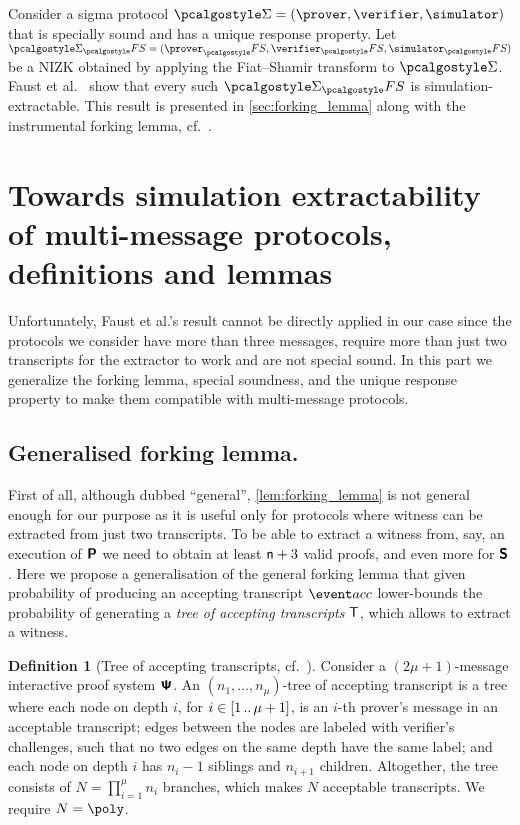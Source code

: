 \documentclass[runningheads,11pt]{llncs}
\theoremstyle{definition} \newtheorem{definition}[theorem]{Definition}
\begin{document}
Consider a sigma protocol $\sigmaprot = (\prover, \verifier, \simulator)$ that
is specially sound and has a unique response property. Let $\sigmaprot_\fs =
(\prover_\fs, \verifier_\fs, \simulator_\fs)$ be a NIZK obtained by applying the
Fiat--Shamir transform to $\sigmaprot$. Faust et al.~\cite{INDOCRYPT:FKMV12}
show that every such $\sigmaprot_\fs$ is simulation-extractable. This result is
presented in \cref{sec:forking_lemma} along with the instrumental forking lemma,
cf.~\cite{CCS:BelNev06}.

\section{Towards simulation extractability of multi-message protocols,
  definitions and lemmas}
\label{sec:se_definitions}
Unfortunately, Faust et al.'s result cannot be directly applied in our case
since the protocols we consider have more than three messages, require more than
just two transcripts for the extractor to work and are not special
sound. In this part we generalize the forking lemma, special
soundness, and the unique response property to make them compatible with
multi-message protocols.

\subsection{Generalised forking lemma.}
First of all, although dubbed ``general'', \cref{lem:forking_lemma} is not
general enough for our purpose as it is useful only for protocols where witness
can be extracted from just two transcripts. To be able to extract a witness
from, say, an execution of $\bm{\mathsf{P}}$ we need to obtain at least
$\mathsf{n} + 3$ valid proofs, and even more for $\bm{\mathsf{S}}$. Here we
propose a generalisation of the general forking lemma that given probability of
producing an accepting transcript $\accProb$ lower-bounds the probability of
generating a \emph{tree of accepting transcripts} $\mathsf{T}$, which allows to
extract a witness.

\begin{definition}[Tree of accepting transcripts, cf.~{\cite{EC:BCCGP16}}]
	\label{def:tree_of_accepting_transcripts}
	Consider a $(2\mu + 1)$-message interactive proof system $\bm{\mathsf{\Psi}}$. An $(n_1,
  \ldots, n_\mu)$-tree of accepting transcript is a tree where each node on
  depth $i$, for $i \in [1 \, .. \, \mu + 1]$, is an $i$-th prover's message in an
  acceptable transcript; edges between the nodes are labeled with verifier's
  challenges, such that no two edges on the same depth have the same
  label; and each node on depth $i$ has $n_{i} - 1$ siblings and $n_{i +
    1}$ children. Altogether, the tree consists of $N = \prod_{i = 1}^\mu n_i$
  branches, which makes $N$ acceptable transcripts. We require $N = \poly$.
\end{definition}
\end{document}
